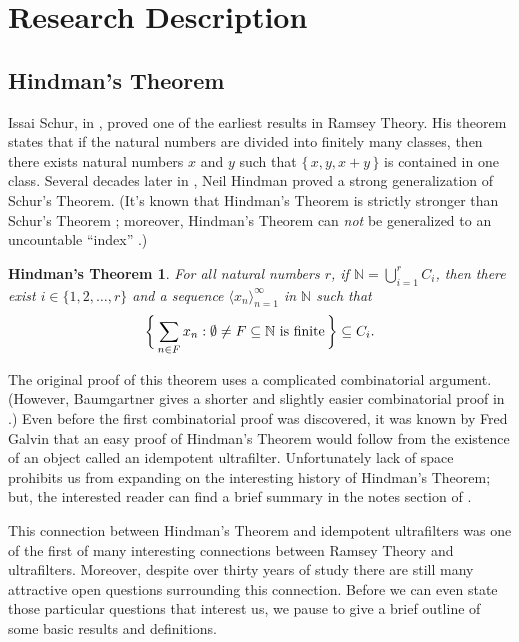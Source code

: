 \documentclass[12pt]{article}
\theoremstyle{plain}
\newtheorem{fst}[thm]{Hindman's Theorem}
\theoremstyle{definition}
\newcommand{\bbN}{\mathbb{N}}
\newcommand{\la}{\langle}
\newcommand{\ra}{\rangle}
\begin{document}
\section{Research Description}
\subsection{Hindman's Theorem}
Issai Schur, in \cite{Schur:1916fk}, proved one of the earliest
results in Ramsey Theory.
His theorem states that if the natural numbers are divided into
finitely many classes, then there exists natural numbers $x$ and $y$
such that $\{\,x, y, x+y\,\}$ is contained in one class.
Several decades later in \cite{Hindman:1974ys}, Neil Hindman proved a
strong generalization of Schur's Theorem.
(It's known that Hindman's Theorem is strictly stronger than Schur's
Theorem \cite[Theorems 16.28 and 16.29]{Hindman:1998fk}; moreover,
Hindman's Theorem can \textsl{not} be generalized to an uncountable
``index'' \cite{Milliken:1978fk}.)
\begin{fst}
  For all natural numbers $r$, if \/ $\bbN = \bigcup_{i=1}^r C_i$,
  then there exist $i \in \{1, 2, \ldots, r\}$ and a sequence $\la x_n
  \ra_{n=1}^\infty$ in $\bbN$ such that
  \[
    \biggl\{\, \sum_{n \in F} x_n : \hbox{$\emptyset \ne F \subseteq
      \bbN$ is finite} \,\biggr\} \subseteq C_i.
  \]
\end{fst}

The original proof of this theorem uses a complicated combinatorial
argument. 
(However, Baumgartner gives a shorter and slightly easier
combinatorial proof in \cite{Baumgartner:1974uq}.)
Even before the first combinatorial proof was discovered, it was known
by Fred Galvin that an easy proof of Hindman's Theorem would follow
from the existence of an object called an idempotent ultrafilter.
Unfortunately lack of space prohibits us from expanding on the
interesting history of Hindman's Theorem; but, the interested reader
can find a brief summary in the notes section of \cite[Chapter
5]{Hindman:1998fk}.

This connection between Hindman's Theorem and idempotent ultrafilters
was one of the first of many interesting connections between Ramsey
Theory and ultrafilters.
Moreover, despite over thirty years of study there are still many
attractive open questions surrounding this connection. 
Before we can even state those particular questions that interest us,
we pause to give a brief outline of some basic results and
definitions. 
\end{document}
